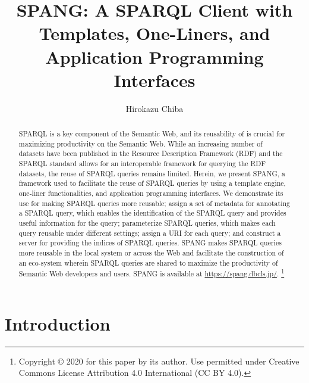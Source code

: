 \documentclass[runningheads]{llncs}
\newcommand\blfootnote[1]{%
  \begingroup
  \renewcommand\thefootnote{}\footnote{#1}%
  \addtocounter{footnote}{-1}%
  \endgroup
}
\begin{document}
\title{SPANG: A SPARQL Client with Templates, One-Liners, and Application Programming Interfaces}
\author{Hirokazu Chiba}
%
\maketitle              %
%

\begin{abstract}
SPARQL is a key component of the Semantic Web, and its reusability of is crucial for maximizing productivity on the Semantic Web.
While an increasing number of datasets have been published in the Resource Description Framework (RDF) and the SPARQL standard allows for an interoperable framework for querying the RDF datasets, the reuse of SPARQL queries remains limited. Herein, we present SPANG, a framework used to facilitate the reuse of SPARQL queries by using a template engine, one-liner functionalities, and application programming interfaces. We demonstrate its use for making SPARQL queries more reusable; assign a set of metadata for annotating a SPARQL query, which enables the identification of the SPARQL query and provides useful information for the query; parameterize SPARQL queries, which makes each query reusable under different settings; assign a URI for each query; and construct a server for providing the indices of SPARQL queries. SPANG makes SPARQL queries more reusable in the local system or across the Web and facilitate the construction of an eco-system wherein SPARQL queries are shared to maximize the productivity of Semantic Web developers and users. SPANG is available at \url{https://spang.dbcls.jp/}.
\blfootnote{Copyright © 2020 for this paper by its author. Use permitted under Creative Commons License Attribution 4.0 International (CC BY 4.0).}

\end{abstract}


\section{Introduction}
\end{document}
